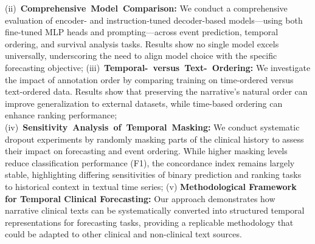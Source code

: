 \mbox{(ii) \textbf{Comprehensive Model Comparison:}} 
    We conduct a comprehensive evaluation of encoder- and instruction-tuned decoder-based models—using both fine-tuned MLP heads and prompting—across event prediction, temporal ordering, and survival analysis tasks. Results show no single model excels universally, underscoring the need to align model choice with the specific forecasting objective;
\mbox{(iii) \textbf{Temporal- versus Text- Ordering:}}
    We investigate the impact of annotation order by comparing training on time-ordered versus text-ordered data. Results show that preserving the narrative's natural order can improve generalization to external datasets, while time-based ordering can enhance ranking performance;
\mbox{(iv) \textbf{Sensitivity Analysis of Temporal Masking:}}
    We conduct systematic dropout experiments by randomly masking parts of the clinical history to assess their impact on forecasting and event ordering. While higher masking levels reduce classification performance (F1), the concordance index remains largely stable, highlighting differing sensitivities of binary prediction and ranking tasks to historical context in textual time series;
(v) \textbf{Methodological Framework for Temporal Clinical Forecasting:} Our approach demonstrates how narrative clinical texts can be systematically converted into structured temporal representations for forecasting tasks, providing a replicable methodology that could be adapted to other clinical and non-clinical text sources. %




